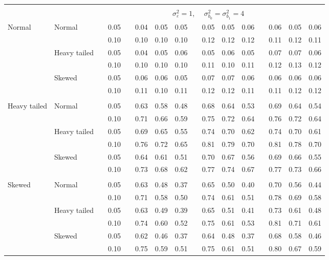 \documentclass[12pt]{article} %
\begin{document}
\begin{table}[ht]
\begin{scriptsize}
\begin{center}
\begin{tabular}{ll p{.1cm} c p{.1cm} rrr p{.1cm} rrr p{.1cm} rrr}
&&&&&&&&&&&&&&&\\
& && && \multicolumn{9}{c}{$\sigma_{\varepsilon}^2 = 1$, \ \ $\sigma_{b_0}^2 = \sigma_{b_1}^2 = 4$} \\ \cline{6-16}
\rowcolor{gray!20}Normal       & Normal       && 0.05 &&   0.04 & 0.05 & 0.05 && 0.05 & 0.05 & 0.06 && 0.06 & 0.05 & 0.06 \\ 
\rowcolor{gray!20}             &              && 0.10 &&   0.10 & 0.10 & 0.10 && 0.12 & 0.12 & 0.12 && 0.11 & 0.12 & 0.11 \\ 
\rowcolor{gray!20}             & Heavy tailed && 0.05 &&   0.04 & 0.05 & 0.06 && 0.05 & 0.06 & 0.05 && 0.07 & 0.07 & 0.06 \\ 
\rowcolor{gray!20}             &              && 0.10 &&   0.10 & 0.10 & 0.10 && 0.11 & 0.10 & 0.11 && 0.12 & 0.13 & 0.12 \\ 
\rowcolor{gray!20}             & Skewed       && 0.05 &&   0.06 & 0.06 & 0.05 && 0.07 & 0.07 & 0.06 && 0.06 & 0.06 & 0.06 \\ 
\rowcolor{gray!20}             &              && 0.10 &&   0.11 & 0.10 & 0.11 && 0.12 & 0.12 & 0.11 && 0.11 & 0.12 & 0.12 \\ 
             &&&&&&&&&&&&&&&\\
Heavy tailed & Normal       && 0.05 &&   0.63 & 0.58 & 0.48 && 0.68 & 0.64 & 0.53 && 0.69 & 0.64 & 0.54 \\
             &              && 0.10 &&   0.71 & 0.66 & 0.59 && 0.75 & 0.72 & 0.64 && 0.76 & 0.72 & 0.64 \\
             & Heavy tailed && 0.05 &&   0.69 & 0.65 & 0.55 && 0.74 & 0.70 & 0.62 && 0.74 & 0.70 & 0.61 \\
             &              && 0.10 &&   0.76 & 0.72 & 0.65 && 0.81 & 0.79 & 0.70 && 0.81 & 0.78 & 0.70 \\
             & Skewed       && 0.05 &&   0.64 & 0.61 & 0.51 && 0.70 & 0.67 & 0.56 && 0.69 & 0.66 & 0.55 \\
             &              && 0.10 &&   0.73 & 0.68 & 0.62 && 0.77 & 0.74 & 0.67 && 0.77 & 0.73 & 0.66 \\
             &&&&&&&&&&&&&&&\\
Skewed       & Normal       && 0.05 &&   0.63 & 0.48 & 0.37 && 0.65 & 0.50 & 0.40 && 0.70 & 0.56 & 0.44 \\ 
             &              && 0.10 &&   0.71 & 0.58 & 0.50 && 0.74 & 0.61 & 0.51 && 0.78 & 0.69 & 0.58 \\ 
             & Heavy tailed && 0.05 &&   0.63 & 0.49 & 0.39 && 0.65 & 0.51 & 0.41 && 0.73 & 0.61 & 0.48 \\ 
             &              && 0.10 &&   0.74 & 0.60 & 0.52 && 0.75 & 0.61 & 0.53 && 0.81 & 0.71 & 0.61 \\ 
             & Skewed       && 0.05 &&   0.62 & 0.46 & 0.37 && 0.64 & 0.48 & 0.37 && 0.68 & 0.58 & 0.46 \\ 
             &              && 0.10 &&   0.75 & 0.59 & 0.51 && 0.75 & 0.61 & 0.51 && 0.80 & 0.67 & 0.59 \\ 



\end{tabular}
\end{center}
\end{scriptsize}
\end{table}
\end{document}
